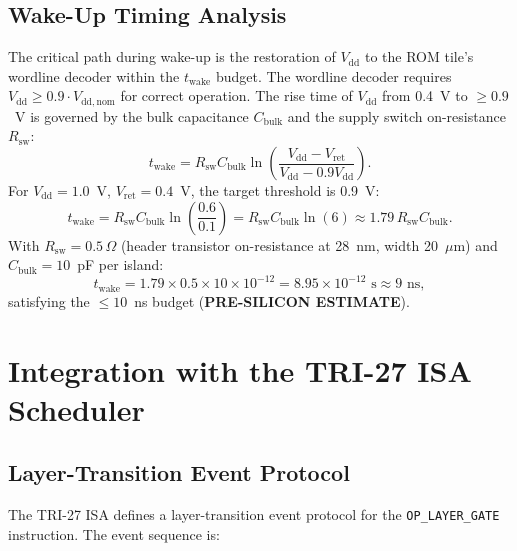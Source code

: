 \subsection{Wake-Up Timing Analysis}

The critical path during wake-up is the restoration of \(V_{\mathrm{dd}}\)
to the ROM tile's wordline decoder within the \(t_{\mathrm{wake}}\) budget.
The wordline decoder requires \(V_{\mathrm{dd}} \geq 0.9 \cdot V_{\mathrm{dd,nom}}\)
for correct operation.  The rise time of \(V_{\mathrm{dd}}\) from 0.4~V
to \(\geq 0.9\)~V is governed by the bulk capacitance \(C_{\mathrm{bulk}}\)
and the supply switch on-resistance \(R_{\mathrm{sw}}\):
\[
  t_{\mathrm{wake}} = R_{\mathrm{sw}} C_{\mathrm{bulk}} \ln\!\left(
    \frac{V_{\mathrm{dd}} - V_{\mathrm{ret}}}{V_{\mathrm{dd}} - 0.9 V_{\mathrm{dd}}}
  \right).
\]
For \(V_{\mathrm{dd}} = 1.0\)~V, \(V_{\mathrm{ret}} = 0.4\)~V, the
target threshold is 0.9~V:
\[
  t_{\mathrm{wake}} = R_{\mathrm{sw}} C_{\mathrm{bulk}} \ln\!\left(
    \frac{0.6}{0.1}\right) = R_{\mathrm{sw}} C_{\mathrm{bulk}} \ln(6)
  \approx 1.79 \, R_{\mathrm{sw}} C_{\mathrm{bulk}}.
\]
With \(R_{\mathrm{sw}} = 0.5\,\Omega\) (header transistor on-resistance
at 28~nm, width 20~\(\mu\)m) and \(C_{\mathrm{bulk}} = 10\)~pF per island:
\[
  t_{\mathrm{wake}} = 1.79 \times 0.5 \times 10 \times 10^{-12}
  = 8.95 \times 10^{-12} \text{ s} \approx 9\text{ ns},
\]
satisfying the \(\leq 10\)~ns budget (\textbf{PRE-SILICON ESTIMATE}).

\section{Integration with the TRI-27 ISA Scheduler}
\label{app:scheduler}

\subsection{Layer-Transition Event Protocol}

The TRI-27 ISA defines a layer-transition event protocol for the
\texttt{OP\_LAYER\_GATE} instruction.  The event sequence is:

